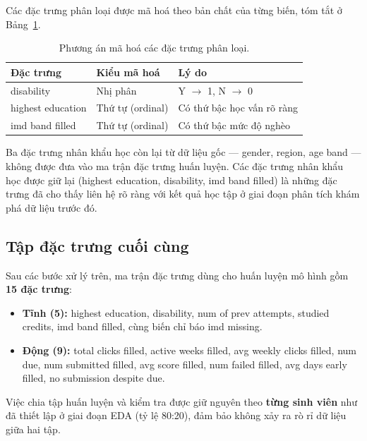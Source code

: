 \documentclass[a4paper]{article}
\newcommand{\code}[1]{{\ttfamily\def\_{\textunderscore\discretionary{}{}{}}#1}}
\def\code#1{#1}%
\def\_{ }%
\begin{document}
Các đặc trưng phân loại được mã hoá theo bản chất của từng biến, tóm tắt ở
Bảng~\ref{tab:encoding}.

\begin{table}[H]
  \centering
  \caption{Phương án mã hoá các đặc trưng phân loại.}
  \label{tab:encoding}
  \begin{tabular}{lll}
    \toprule
    \textbf{Đặc trưng} & \textbf{Kiểu mã hoá} & \textbf{Lý do} \\
    \midrule
    \code{disability}         & Nhị phân & Y $\to$ 1, N $\to$ 0 \\
    \code{highest\_education} & Thứ tự (ordinal) & Có thứ bậc học vấn rõ ràng \\
    \code{imd\_band\_filled}  & Thứ tự (ordinal) & Có thứ bậc mức độ nghèo \\
    \bottomrule
  \end{tabular}
\end{table}

Ba đặc trưng nhân khẩu học còn lại từ dữ liệu gốc --- \code{gender},
\code{region}, \code{age\_band} --- không được đưa vào ma trận đặc trưng huấn
luyện. Các đặc trưng nhân khẩu học được giữ lại (\code{highest\_education},
\code{disability}, \code{imd\_band\_filled}) là những đặc trưng đã cho thấy
liên hệ rõ ràng với kết quả học tập ở giai đoạn phân tích khám phá dữ liệu
trước đó.

\subsection{Tập đặc trưng cuối cùng}

Sau các bước xử lý trên, ma trận đặc trưng dùng cho huấn luyện mô hình gồm
\textbf{15 đặc trưng}:

\begin{itemize}[leftmargin=*]
  \item \textbf{Tĩnh (5):} \code{highest\_education}, \code{disability},
        \code{num\_of\_prev\_attempts}, \code{studied\_credits},
        \code{imd\_band\_filled}, cùng biến chỉ báo \code{imd\_missing}.
  \item \textbf{Động (9):} \code{total\_clicks\_filled},
        \code{active\_weeks\_filled}, \code{avg\_weekly\_clicks\_filled},
        \code{num\_due}, \code{num\_submitted\_filled},
        \code{avg\_score\_filled}, \code{num\_failed\_filled},
        \code{avg\_days\_early\_filled}, \code{no\_submission\_despite\_due}.
\end{itemize}

Việc chia tập huấn luyện và kiểm tra được giữ nguyên theo \textbf{từng sinh
viên} như đã thiết lập ở giai đoạn EDA (tỷ lệ 80:20), đảm bảo không xảy ra rò
rỉ dữ liệu giữa hai tập.
\end{document}
